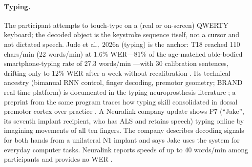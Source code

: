 \documentclass[11pt]{article}
\newcommand{\wpm}{words/min}
\newcommand{\cpm}{chars/min}
\begin{document}
\paragraph{Typing.} The participant attempts to touch-type on a (real or
on-screen) QWERTY keyboard; the decoded object is the keystroke sequence
itself, not a cursor and not dictated speech. Jude et al., 2026a (typing)
is the anchor:
T18 reached 110 \cpm{} (22 \wpm{}) at 1.6\% WER---81\% of the
age-matched able-bodied smartphone-typing rate of 27.3 \wpm{}
\cite{palin2019}---with 30 calibration
sentences, drifting only to 12\% WER after a week without recalibration
\cite{jude2026typing}. Its technical ancestry (bimanual RNN control,
finger decoding, premotor geometry; BRAND real-time platform) is
documented in the typing-neuroprosthesis literature
\cite{deo2024, willsey2025, shah2025, ali2024}; a preprint from the same
program traces how typing skill consolidated in dorsal premotor cortex
over practice \cite{hashimoto2026}. A Neuralink company update shows
P7 (``Jake'', its seventh implant recipient, who has ALS and retains
speech) typing online by imagining movements of all ten fingers. The
company describes decoding signals for both hands from a unilateral N1
implant and says Jake uses the system for everyday computer tasks.
Neuralink reports speeds of up to 40 \wpm{} among participants and
provides no WER \cite{neuralink2026, schneider2025}.
\end{document}
